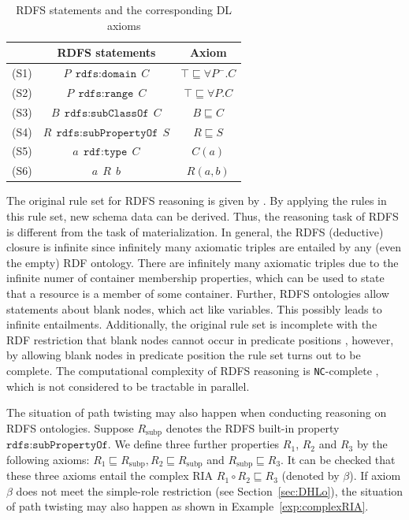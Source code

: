 \begin{table}
\centering
\caption{RDFS statements and the corresponding DL axioms}
{\setlength{\tabcolsep}{6mm}
\begin{tabular}{lcc}
\hline
& RDFS statements & Axiom\\
\hline
\hline
(S1)&$P~~\texttt{rdfs:domain}~~C$& $\top\sqsubseteq\forall P^-.C$\\

(S2)&$P~~\texttt{rdfs:range}~~C$& $\top\sqsubseteq\forall P.C$\\

(S3)&$B~~\texttt{rdfs:subClassOf}~~C$& $B\sqsubseteq C$\\

(S4)&$R~~\texttt{rdfs:subPropertyOf}~~S$& $R\sqsubseteq S$\\
\hline
(S5)&$a~~\texttt{rdf:type}~~C$& $C(a)$\\

(S6)&$a~~R~~b$& $R(a,b)$\\
\hline
\end{tabular}}
\label{tab:rdfs}
\end{table}




The original rule set for RDFS reasoning is given by
\citet{RDFSrec04}. By applying the rules in this rule set, new schema
data can be derived. Thus, the reasoning task of RDFS is different
from the task of materialization. In general, the RDFS (deductive)
closure is infinite since infinitely many axiomatic triples are
entailed by any (even the empty) RDF ontology. There are infinitely
many axiomatic triples due to the infinite numer of container
membership properties, which can be used to state that a resource is a
member of some container. Further, RDFS ontologies allow statements
about blank nodes, which act like variables. This possibly leads to
infinite entailments. Additionally, the original rule set is
incomplete with the RDF restriction that
blank nodes cannot occur in predicate positions \cite{Horst05},
however, by allowing blank nodes in predicate position
the rule set turns out to be complete. The computational complexity
of RDFS reasoning is \texttt{NC}-complete \cite{Horst05},
which is not considered to be tractable in parallel.

The situation of path twisting may also happen when conducting reasoning
on RDFS ontologies. Suppose $R_{\text{subp}}$ denotes the RDFS built-in property $\texttt{rdfs:subPropertyOf}$.
We define three further properties $R_1$, $R_2$ and $R_3$ by the following axioms:
$R_1\sqsubseteq R_{\text{subp}}, R_2\sqsubseteq R_{\text{subp}}$ and $R_{\text{subp}}\sqsubseteq R_3$.
It can be checked that these three axioms entail the complex RIA $R_1\circ R_2\sqsubseteq R_3$ (denoted by $\beta$).
If axiom $\beta$ does not meet the simple-role restriction (see Section~\ref{sec:DHLo}),
the situation of path twisting may also happen as shown in Example~\ref{exp:complexRIA}.

